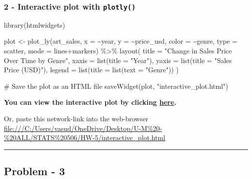 \documentclass[
  12pt,
]{article}
\newenvironment{Shaded}{\begin{snugshade}}{\end{snugshade}}
\newcommand{\AttributeTok}[1]{\textcolor[rgb]{0.40,0.45,0.13}{#1}}
\newcommand{\CommentTok}[1]{\textcolor[rgb]{0.37,0.37,0.37}{#1}}
\newcommand{\FunctionTok}[1]{\textcolor[rgb]{0.28,0.35,0.67}{#1}}
\newcommand{\NormalTok}[1]{\textcolor[rgb]{0.00,0.23,0.31}{#1}}
\newcommand{\OtherTok}[1]{\textcolor[rgb]{0.00,0.23,0.31}{#1}}
\newcommand{\SpecialCharTok}[1]{\textcolor[rgb]{0.37,0.37,0.37}{#1}}
\newcommand{\StringTok}[1]{\textcolor[rgb]{0.13,0.47,0.30}{#1}}
\begin{document}
\subsubsection{\texorpdfstring{2 - Interactive plot with
\texttt{plotly()}}{2 - Interactive plot with plotly()}}\label{interactive-plot-with-plotly}

\begin{Shaded}
\begin{Highlighting}[]
\FunctionTok{library}\NormalTok{(htmlwidgets)}
  
\NormalTok{plot }\OtherTok{\textless{}{-}} \FunctionTok{plot\_ly}\NormalTok{(art\_sales, }\AttributeTok{x =} \SpecialCharTok{\textasciitilde{}}\NormalTok{year, }\AttributeTok{y =} \SpecialCharTok{\textasciitilde{}}\NormalTok{price\_usd, }\AttributeTok{color =} \SpecialCharTok{\textasciitilde{}}\NormalTok{genre, }\AttributeTok{type =} \StringTok{\textquotesingle{}scatter\textquotesingle{}}\NormalTok{, }\AttributeTok{mode =} \StringTok{\textquotesingle{}lines+markers\textquotesingle{}}\NormalTok{) }\SpecialCharTok{\%\textgreater{}\%}
  \FunctionTok{layout}\NormalTok{(}
    \AttributeTok{title =} \StringTok{"Change in Sales Price Over Time by Genre"}\NormalTok{,}
    \AttributeTok{xaxis =} \FunctionTok{list}\NormalTok{(}\AttributeTok{title =} \StringTok{"Year"}\NormalTok{),}
    \AttributeTok{yaxis =} \FunctionTok{list}\NormalTok{(}\AttributeTok{title =} \StringTok{"Sales Price (USD)"}\NormalTok{),}
    \AttributeTok{legend =} \FunctionTok{list}\NormalTok{(}\AttributeTok{title =} \FunctionTok{list}\NormalTok{(}\AttributeTok{text =} \StringTok{"Genre"}\NormalTok{))}
\NormalTok{  )}

\CommentTok{\# Save the plot as an HTML file}
\FunctionTok{saveWidget}\NormalTok{(plot, }\StringTok{"interactive\_plot.html"}\NormalTok{)}
\end{Highlighting}
\end{Shaded}

\textbf{You can view the interactive plot by clicking
\href{./interactive_plot.html}{here}.}

Or, paste this network-link into the web-browser
\url{file:///C:/Users/vasud/OneDrive/Desktop/U-M\%20-\%20ALL/STATS\%20506/HW-5/interactive_plot.html}

\hfill\break

\begin{center}\rule{0.5\linewidth}{0.5pt}\end{center}

\subsection{Problem - 3}\label{problem---3}
\end{document}
